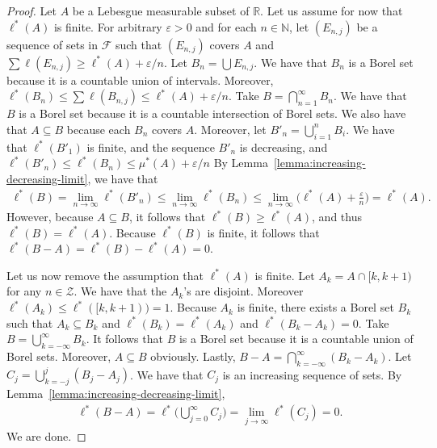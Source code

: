 \documentclass[10pt]{article}
\newcommand{\mcal}[1]{\mathcal{#1}}
\newcommand{\Real}{\mathbb{R}}
\begin{document}
\begin{itemize}
  \begin{proof}
    Let $A$ be a Lebesgue measurable subset of $\Real$. Let us assume for now that $\ell^*(A)$ is finite. For arbitrary $\varepsilon > 0$ and for each $n \in \mathbb{N}$, let $(E_{n,j})$ be a sequence of sets in $\mcal{F}$ such that $(E_{n,j})$ covers $A$ and $\sum \ell(E_{n,j}) \geq \ell^*(A) + \varepsilon/n$. Let $B_n = \bigcup E_{n,j}$. We have that $B_n$ is a Borel set because it is a countable union of intervals. Moreover, $\ell^*(B_n) \leq \sum \ell(B_{n,j}) \leq \ell^*(A) + \varepsilon/n$. Take $B = \bigcap_{n=1}^\infty B_n$. We have that $B$ is a Borel set because it is a countable intersection of Borel sets. We also have that $A \subseteq B$ because each $B_n$ covers $A$. Moreover, let $B'_n = \bigcup_{i=1}^n B_i$. We have that $\ell^*(B'_1)$ is finite, and the sequence $B'_n$ is decreasing, and $\ell^*(B'_n) \leq \ell^*(B_n) \leq \mu^*(A) + \varepsilon / n$ By Lemma~\ref{lemma:increasing-decreasing-limit}, we have that 
    \begin{align*}
    \ell^*(B) = \lim_{n \rightarrow \infty} \ell^*(B'_n) \leq \lim_{n \rightarrow \infty} \ell^*(B_n) \leq \lim_{n\rightarrow \infty} \bigg( \ell^*(A) + \frac{\varepsilon}{n} \bigg) = \ell^*(A).
    \end{align*}
    However, because $A \subseteq B$, it follows that $\ell^*(B) \geq \ell^*(A)$, and thus $\ell^*(B) = \ell^*(A)$. Because $\ell^*(B)$ is finite, it follows that $\ell^*(B - A) = \ell^*(B) - \ell^*(A) = 0$.

    Let us now remove the assumption that $\ell^*(A)$ is finite. Let $A_k = A \cap [k,k+1)$ for any $n \in \mcal{Z}$. We have that the $A_k$'s are disjoint. Moreover $\ell^*(A_k) \leq \ell^*([k,k+1)) = 1$. Because $A_k$ is finite, there exists a Borel set $B_k$ such that $A_k \subseteq B_k$ and $\ell^*(B_k) = \ell^*(A_k)$ and $\ell^*(B_k - A_k) = 0$. Take $B = \bigcup_{k=-\infty}^\infty B_k$. It follows that $B$ is a Borel set because it is a countable union of Borel sets. Moreover, $A \subseteq B$ obviously. Lastly, $B-A = \bigcap_{k=-\infty}^\infty (B_k-A_k)$. Let $C_j = \bigcup_{k=-j}^j (B_j - A_j)$. We have that $C_j$ is an increasing sequence of sets. By Lemma~\ref{lemma:increasing-decreasing-limit},
    \begin{align*}
      \ell^*(B-A) = \ell^*\bigg( \bigcup_{j=0}^\infty C_j \bigg) = \lim_{j \rightarrow \infty} \ell^*(C_j) = 0.
    \end{align*}
    We are done.
  \end{proof}
\end{itemize}
\end{document}
